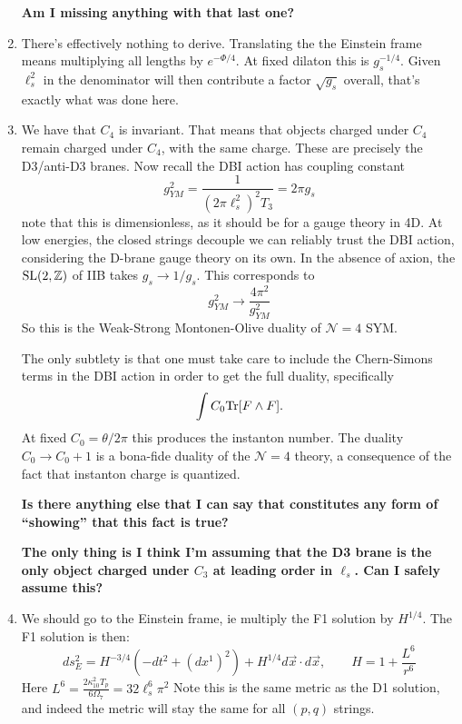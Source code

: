 \documentclass[11pt, class=article, crop=false]{standalone}
\begin{document}
\begin{enumerate}
	\textbf{Am I missing anything with that last one?}
	
	\item There's effectively nothing to derive. Translating the the Einstein frame means multiplying all lengths by $e^{-\Phi/4}$. At fixed dilaton this is $g_s^{-1/4}$. Given $\ell_s^2$ in the denominator will then contribute a factor $\sqrt{g_s}$ overall, that's exactly what was done here.  
	
	\item We have that $C_4$ is invariant. That means that objects charged under $C_4$ remain charged under $C_4$, with the same charge. These are precisely the D3/anti-D3 branes. Now recall the DBI action has coupling constant
	\[
		g_{YM}^2 = \frac{1}{(2\pi \ell_s^2)^2 T_3} = 2 \pi g_s
	\]
	note that this is dimensionless, as it should be for a gauge theory in 4D. At low energies, the closed strings decouple we can reliably trust the DBI action, considering the D-brane gauge theory on its own. In the absence of axion, the $\mathrm{SL}(2, \mathbb{Z})$ of IIB takes $g_s \to 1/g_s$. This corresponds to
	\[
		g^2_{YM} \to \frac{4\pi^2}{g_{YM}^2}
	\]
	So this is the Weak-Strong Montonen-Olive duality of $\mathcal N=4$ SYM.
	
	The only subtlety is that one must take care to include the Chern-Simons terms in the DBI action in order to get the full duality, specifically 
	\[
		\int C_0 \mathrm{Tr} [F \wedge F].
	\]
	At fixed $C_0 = \theta/2\pi$ this produces the instanton number. The duality $C_0 \to C_0 + 1$ is a bona-fide duality of the $\mathcal N=4$ theory, a consequence of the fact that instanton charge is quantized. 
	
	\textbf{Is there anything else that I can say that constitutes any form of ``showing'' that this fact is true?}
	
	\textbf{The only thing is I think I'm assuming that the D3 brane is the only object charged under $C_3$ at leading order in $\ell_s$. Can I safely assume this?}
	
	\item We should go to the Einstein frame, ie multiply the F1 solution by $H^{1/4}$. The F1 solution is then:
	\[
		ds^2_E = H^{-3/4}(-dt^2 + (dx^1)^2)+ H^{1/4} d \vec x \cdot d \vec x, \qquad H = 1 + \frac{L^6}{r^6}
	\]
	Here $L^6 = \frac{2 \kappa_{10}^2 T_p}{6 \Omega_7} = 32 \ell_s^6 \pi^2$ %
	Note this is the same metric as the D1 solution, and indeed the metric will stay the same for all $(p,q)$ strings.
	

\end{enumerate}
\end{document}

